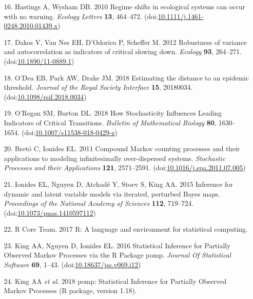 \documentclass[3p]{elsarticle} %
\begin{document}
\leavevmode\hypertarget{ref-Hastings2010}{}%
16. Hastings A, Wysham DB. 2010 Regime shifts in ecological systems can
occur with no warning. \emph{Ecology Letters} \textbf{13}, 464--472.
(doi:\href{https://doi.org/10.1111/j.1461-0248.2010.01439.x}{10.1111/j.1461-0248.2010.01439.x})

\leavevmode\hypertarget{ref-Dakos2012a}{}%
17. Dakos V, Van Nes EH, D'Odorico P, Scheffer M. 2012 Robustness of
variance and autocorrelation as indicators of critical slowing down.
\emph{Ecology} \textbf{93}, 264--271.
(doi:\href{https://doi.org/10.1890/11-0889.1}{10.1890/11-0889.1})

\leavevmode\hypertarget{ref-ODea2018a}{}%
18. O'Dea EB, Park AW, Drake JM. 2018 Estimating the distance to an
epidemic threshold. \emph{Journal of the Royal Society Interface}
\textbf{15}, 20180034.
(doi:\href{https://doi.org/10.1098/rsif.2018.0034}{10.1098/rsif.2018.0034})

\leavevmode\hypertarget{ref-ORegan2018}{}%
19. O'Regan SM, Burton DL. 2018 How Stochasticity Influences Leading
Indicators of Critical Transitions. \emph{Bulletin of Mathematical
Biology} \textbf{80}, 1630--1654.
(doi:\href{https://doi.org/10.1007/s11538-018-0429-z}{10.1007/s11538-018-0429-z})

\leavevmode\hypertarget{ref-Breto2011}{}%
20. Bretó C, Ionides EL. 2011 Compound Markov counting processes and
their applications to modeling infinitesimally over-dispersed systems.
\emph{Stochastic Processes and their Applications} \textbf{121},
2571--2591.
(doi:\href{https://doi.org/10.1016/j.spa.2011.07.005}{10.1016/j.spa.2011.07.005})

\leavevmode\hypertarget{ref-Ionides2015}{}%
21. Ionides EL, Nguyen D, Atchadé Y, Stoev S, King AA. 2015 Inference
for dynamic and latent variable models via iterated, perturbed Bayes
maps. \emph{Proceedings of the National Academy of Sciences}
\textbf{112}, 719--724.
(doi:\href{https://doi.org/10.1073/pnas.1410597112}{10.1073/pnas.1410597112})

\leavevmode\hypertarget{ref-R2017}{}%
22. R Core Team. 2017 R: A language and environment for statistical
computing.

\leavevmode\hypertarget{ref-King2016}{}%
23. King AA, Nguyen D, Ionides EL. 2016 Statistical Inference for
Partially Observed Markov Processes via the R Package pomp.
\emph{Journal Of Statistical Software} \textbf{69}, 1--43.
(doi:\href{https://doi.org/10.18637/jss.v069.i12}{10.18637/jss.v069.i12})

\leavevmode\hypertarget{ref-King2018}{}%
24. King AA \emph{et al.} 2018 pomp: Statistical Inference for Partially
Observed Markov Processes (R package, version 1.18).
\end{document}
